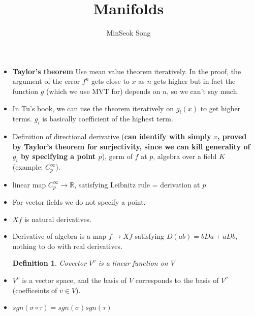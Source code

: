 \documentclass{article}
\title{Manifolds}
\author{MinSeok Song}
\date{}
\newtheorem{definition}{Definition}
\theoremstyle{remark}
\begin{document}
\maketitle                                                                                                                                                   
\begin{itemize}
\subsection*{Notion}
\item \textbf{Taylor's theorem} Use mean value theorem iteratively. In the proof, the argument of the error $f^{n}$ gets close to $x$ as $n$ gets higher but in fact the function $g$ (which we use MVT for) depends on $n$, so we can't say much.
\item In Tu's book, we can use the theorem iteratively on $g_i (x)$ to get higher terms. $g_i$ is basically coefficient of the highest term.
\item Definition of directional derivative (\textbf{can identify with simply $v$, proved by Taylor's theorem for surjectivity, since we can kill generality of $g_i$ by specifying a point $p$}), germ of $f$ at $p$, algebra over a field $K$ (example: $C^\infty_p$).
\item linear map $C^\infty_p\to\mathbb{R}$, satisfying Leibnitz rule = derivation at $p$
\item For vector fields we do not specify a point.
\item $Xf$ is natural derivatives.
\item Derivative of algebra is a map $f\to Xf$ satisfying $D(ab)=bDa+aDb$, nothing to do with real derivatives.
\begin{definition}
Covector $V^v$ is a linear function on $V$
\end{definition}
\item $V^v$ is a vector space, and the basis of $V$ corresponds to the basis of $V^v$ (coefficeints of $v\in V$).
\item $sgn(\sigma\circ \tau)=sgn(\sigma) sgn(\tau)$


\end{itemize}
\end{document}
